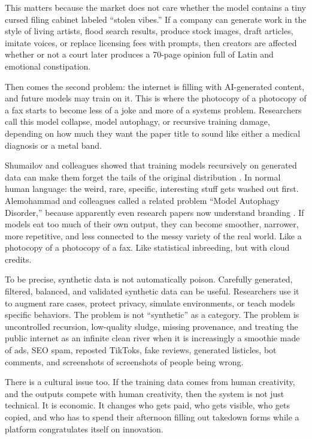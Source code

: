 \documentclass[12pt,oneside]{book}
\begin{document}
This matters because the market does not care whether the model contains a tiny cursed filing cabinet labeled ``stolen vibes.'' If a company can generate work in the style of living artists, flood search results, produce stock images, draft articles, imitate voices, or replace licensing fees with prompts, then creators are affected whether or not a court later produces a 70-page opinion full of Latin and emotional constipation.

Then comes the second problem: the internet is filling with AI-generated content, and future models may train on it. This is where the photocopy of a photocopy of a fax starts to become less of a joke and more of a systems problem. Researchers call this model collapse, model autophagy, or recursive training damage, depending on how much they want the paper title to sound like either a medical diagnosis or a metal band.

Shumailov and colleagues showed that training models recursively on generated data can make them forget the tails of the original distribution \parencite{shumailov2024}. In normal human language: the weird, rare, specific, interesting stuff gets washed out first. Alemohammad and colleagues called a related problem ``Model Autophagy Disorder,'' because apparently even research papers now understand branding \parencite{alemohammad2023}. If models eat too much of their own output, they can become smoother, narrower, more repetitive, and less connected to the messy variety of the real world. Like a photocopy of a photocopy of a fax. Like statistical inbreeding, but with cloud credits.

To be precise, synthetic data is not automatically poison. Carefully generated, filtered, balanced, and validated synthetic data can be useful. Researchers use it to augment rare cases, protect privacy, simulate environments, or teach models specific behaviors. The problem is not ``synthetic'' as a category. The problem is uncontrolled recursion, low-quality sludge, missing provenance, and treating the public internet as an infinite clean river when it is increasingly a smoothie made of ads, SEO spam, reposted TikToks, fake reviews, generated listicles, bot comments, and screenshots of screenshots of people being wrong.

There is a cultural issue too. If the training data comes from human creativity, and the outputs compete with human creativity, then the system is not just technical. It is economic. It changes who gets paid, who gets visible, who gets copied, and who has to spend their afternoon filling out takedown forms while a platform congratulates itself on innovation.
\end{document}

